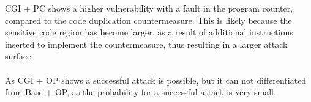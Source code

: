 CGI + PC shows a higher vulnerability with a fault in the program counter, compared to the code duplication countermeasure. This is likely because the sensitive code region has become larger, as a result of additional instructions inserted to implement the countermeasure, thus resulting in a larger attack surface.\\\\
As CGI + OP shows a successful attack is possible, but it can not differentiated from Base + OP, as the probability for a successful attack is very small.